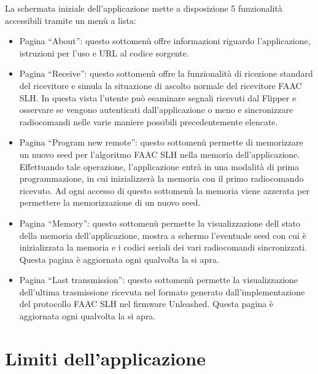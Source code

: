 La schermata iniziale dell’applicazione mette a disposizione 5 funzionalità accessibili tramite un menù a lista:
\begin{itemize}
  \item Pagina “About”: questo sottomenù offre informazioni riguardo l’applicazione, istruzioni per l’uso e URL al codice sorgente.
  \item Pagina “Receive”: questo sottomenù offre la funzionalità di ricezione standard del ricevitore e simula la situazione di ascolto normale del ricevitore FAAC SLH. In questa vista l’utente può esaminare segnali ricevuti dal Flipper e osservare se vengono autenticati dall’applicazione o meno e sincronizzare radiocomandi nelle varie maniere possibili precedentemente elencate.
  \item Pagina “Program new remote”: questo sottomenù permette di memorizzare un nuovo seed per l’algoritmo FAAC SLH nella memoria dell’applicazione. Effettuando tale operazione, l’applicazione entrà in una modalità di prima programmazione, in cui inizializzerà la memoria con il primo radiocomando ricevuto. Ad ogni accesso di questo sottomenù la memoria viene azzerata per permettere la memorizzazione di un nuovo seed.
  \item Pagina “Memory”: questo sottomenù permette la visualizzazione dell stato della memoria dell’applicazione, mostra a schermo l’eventuale seed con cui è inizializzata la memoria e i codici seriali dei vari radiocomandi sincronizzati. Questa pagina è aggiornata ogni qualvolta la si apra.
  \item Pagina “Last transmission”: questo sottomenù permette la visualizzazione dell’ultima trasmissione ricevuta nel formato generato dall’implementazione del protocollo FAAC SLH nel firmware Unleashed. Questa pagina è aggiornata ogni qualvolta la si apra.
\end{itemize}

\section{Limiti dell'applicazione}
\label{sec:limits}

